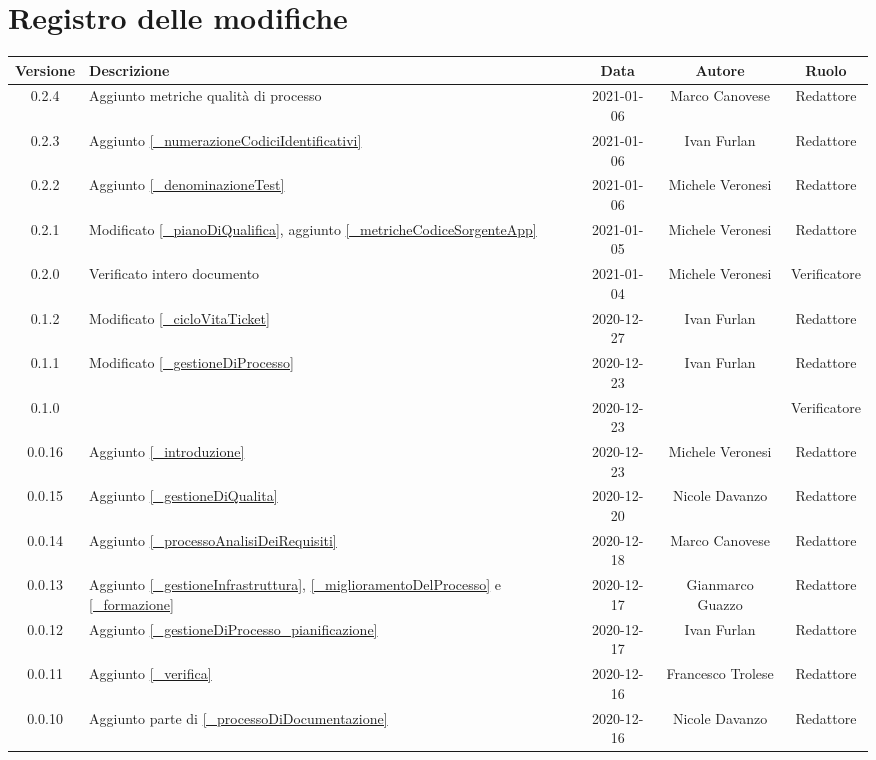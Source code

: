 \section*{Registro delle modifiche}

\begin{center}
	\begin{longtable}{|c|p{5cm}|c|c|c|}
		\hline
		\rowcolor{lighter-grayer}
		\textbf{Versione} & \textbf{Descrizione} & \textbf{Data} & \textbf{Autore} & \textbf{Ruolo} \\
		\hline
		\endfirsthead

		0.2.4 & Aggiunto metriche qualità di processo & 2021-01-06 & Marco Canovese & Redattore \\
		0.2.3 & Aggiunto \ref{_numerazioneCodiciIdentificativi} & 2021-01-06 & Ivan Furlan & Redattore \\
		0.2.2 & Aggiunto \ref{_denominazioneTest} & 2021-01-06 & Michele Veronesi & Redattore \\
		0.2.1 & Modificato \ref{_pianoDiQualifica}, aggiunto \ref{_metricheCodiceSorgenteApp} & 2021-01-05 & Michele Veronesi & Redattore \\
		0.2.0 & Verificato intero documento & 2021-01-04 & Michele Veronesi & Verificatore \\
		0.1.2 & Modificato \ref{_cicloVitaTicket} & 2020-12-27& Ivan Furlan & Redattore \\
		0.1.1 & Modificato \ref{_gestioneDiProcesso} & 2020-12-23 & Ivan Furlan & Redattore \\
		0.1.0 &  & 2020-12-23 &  & Verificatore \\
		0.0.16 & Aggiunto \ref{_introduzione} & 2020-12-23 & Michele Veronesi & Redattore \\
		0.0.15 & Aggiunto \ref{_gestioneDiQualita} & 2020-12-20 & Nicole Davanzo & Redattore \\
		0.0.14 & Aggiunto \ref{_processoAnalisiDeiRequisiti} & 2020-12-18 & Marco Canovese & Redattore \\
		0.0.13 & Aggiunto \ref{_gestioneInfrastruttura}, \ref{_miglioramentoDelProcesso} e \ref{_formazione} & 2020-12-17 & Gianmarco Guazzo & Redattore \\
		0.0.12 & Aggiunto \ref{_gestioneDiProcesso_pianificazione} & 2020-12-17 & Ivan Furlan & Redattore \\
		0.0.11 & Aggiunto \ref{_verifica} & 2020-12-16 & Francesco Trolese & Redattore \\
		0.0.10 & Aggiunto parte di \ref{_processoDiDocumentazione} & 2020-12-16 & Nicole Davanzo & Redattore \\

\end{longtable}
\end{center}
